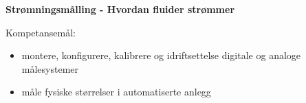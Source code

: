 \centerline{\bf Strømningsmålling - Hvordan fluider strømmer}  \bigskip

Kompetansemål:
\begin{itemize}[noitemsep]

	\item montere, konfigurere, kalibrere og idriftsettelse digitale og analoge målesystemer
	\item måle fysiske størrelser i automatiserte anlegg
\end{itemize}
\vskip 2cm

